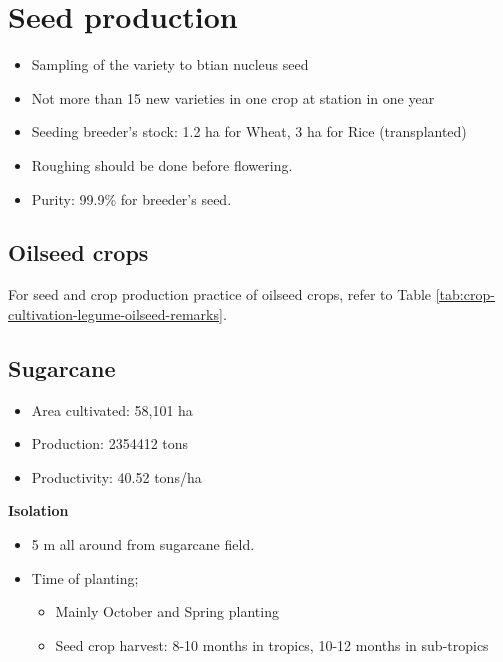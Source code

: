 \documentclass[
  openany]{book}
\providecommand{\tightlist}{%
  \setlength{\itemsep}{0pt}\setlength{\parskip}{0pt}}
\begin{document}
\hypertarget{seed-production}{%
\section{Seed production}\label{seed-production}}

\begin{itemize}
\item
  Sampling of the variety to btian nucleus seed
\item
  Not more than 15 new varieties in one crop at station in one year
\item
  Seeding breeder's stock: 1.2 ha for Wheat, 3 ha for Rice (transplanted)
\item
  Roughing should be done before flowering.
\item
  Purity: 99.9\% for breeder's seed.
\end{itemize}

\hypertarget{oilseed-crops}{%
\subsection{Oilseed crops}\label{oilseed-crops}}

For seed and crop production practice of oilseed crops, refer to Table \ref{tab:crop-cultivation-legume-oilseed-remarks}.

\hypertarget{sugarcane}{%
\subsection{Sugarcane}\label{sugarcane}}

\begin{itemize}
\tightlist
\item
  Area cultivated: 58,101 ha
\item
  Production: 2354412 tons
\item
  Productivity: 40.52 tons/ha
\end{itemize}

\textbf{Isolation}

\begin{itemize}
\tightlist
\item
  5 m all around from sugarcane field.
\item
  Time of planting;

  \begin{itemize}
  \tightlist
  \item
    Mainly October and Spring planting
  \item
    Seed crop harvest: 8-10 months in tropics, 10-12 months in sub-tropics
  \end{itemize}
\end{itemize}
\end{document}
